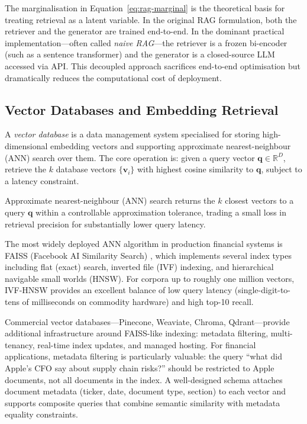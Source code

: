 \begin{deepdive}
The marginalisation in Equation~\eqref{eq:rag-marginal} is the theoretical basis for
treating retrieval as a latent variable. In the original RAG formulation, both the
retriever and the generator are trained end-to-end. In the dominant practical
implementation---often called \emph{naive RAG}---the retriever is a frozen
bi-encoder (such as a sentence transformer) and the generator is a closed-source LLM
accessed via API. This decoupled approach sacrifices end-to-end optimisation but
dramatically reduces the computational cost of deployment.


\subsection{Vector Databases and Embedding Retrieval}
\label{subsec:vector-db}

A \emph{vector database} is a data management system specialised for storing high-dimensional
embedding vectors and supporting approximate nearest-neighbour (ANN) search over them.
The core operation is: given a query vector $\mathbf{q} \in \mathbb{R}^D$, retrieve
the $k$ database vectors $\{\mathbf{v}_i\}$ with highest cosine similarity to $\mathbf{q}$,
subject to a latency constraint.

Approximate nearest-neighbour (ANN) search returns the $k$ closest vectors to a query $\mathbf{q}$ within a controllable approximation tolerance, trading a small loss in retrieval precision for substantially lower query latency.

The most widely deployed ANN algorithm in production financial systems is FAISS (Facebook
AI Similarity Search) \cite{johnson2019billion}, which implements several index types
including flat (exact) search, inverted file (IVF) indexing, and hierarchical navigable
small worlds (HNSW). For corpora up to roughly one million vectors, IVF-HNSW provides
an excellent balance of low query latency (single-digit-to-tens of milliseconds on
commodity hardware) and high top-10 recall.

Commercial vector databases---Pinecone, Weaviate, Chroma, Qdrant---provide additional
infrastructure around FAISS-like indexing: metadata filtering, multi-tenancy, real-time
index updates, and managed hosting. For financial applications, metadata filtering is
particularly valuable: the query ``what did Apple's CFO say about supply chain risks?''
should be restricted to Apple documents, not all documents in the index. A well-designed
schema attaches document metadata (ticker, date, document type, section) to each vector
and supports composite queries that combine semantic similarity with metadata equality
constraints.


\end{deepdive}
